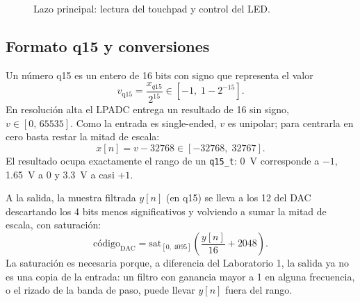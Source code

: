 \documentclass[11pt,a4paper]{article}
\begin{document}
\begin{figure}[H]
\centering
{}
\caption{Lazo principal: lectura del touchpad y control del LED.}
\label{fig:flujo-lazo}
\end{figure}

\subsection{Formato q15 y conversiones}\label{sec:q15}

Un número q15 es un entero de 16 bits con signo que representa el valor
\begin{equation}
  v_{\mathrm{q15}} = \frac{x_{q15}}{2^{15}} \in \left[-1,\; 1-2^{-15}\right].
\end{equation}
En resolución alta el LPADC entrega un resultado de \qty{16}{\bit} sin signo,
$v \in [0,\, 65535]$. Como la entrada es single-ended, $v$ es unipolar; para
centrarla en cero basta restar la mitad de escala:
\begin{equation}
  x[n] = v - 32768 \in [-32768,\; 32767].
\end{equation}
El resultado ocupa exactamente el rango de un \texttt{q15\_t}:
\qty{0}{\volt} corresponde a $-1$, \qty{1.65}{\volt} a $0$ y
\qty{3.3}{\volt} a casi $+1$.

A la salida, la muestra filtrada $y[n]$ (en q15) se lleva a los
\qty{12}{\bit} del DAC descartando los 4 bits menos significativos y
volviendo a sumar la mitad de escala, con saturación:
\begin{equation}
  \text{código}_{\text{DAC}} =
  \mathrm{sat}_{[0,\,4095]}\!\left(\frac{y[n]}{16} + 2048\right).
\end{equation}
La saturación es necesaria porque, a diferencia del Laboratorio 1, la salida
ya no es una copia de la entrada: un filtro con ganancia mayor a 1 en alguna
frecuencia, o el rizado de la banda de paso, puede llevar $y[n]$ fuera del
rango.
\end{document}
